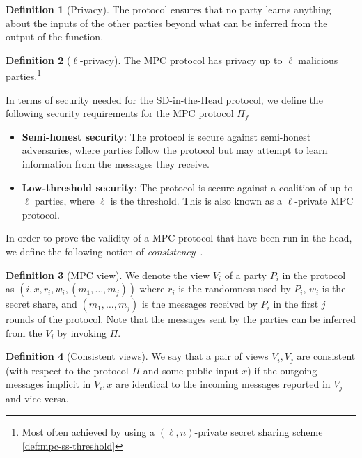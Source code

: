 \documentclass[twoside,11pt]{report}
\theoremstyle{definition}
\newtheorem{definition}{Definition}[section]
\theoremstyle{plain}
\begin{document}
\begin{definition}[Privacy]\label{def:mpc-privacy}
  The protocol ensures that no party learns anything about the inputs of the other parties beyond what can be inferred from the output of the function.
\end{definition}

\begin{definition}[$\ell$-privacy]\label{def:mpc-ell-privacy}
  The MPC protocol has privacy up to $\ell$ malicious parties.\footnote{Most often achieved by using a $(\ell, n)$-private secret sharing scheme \autoref{def:mpc-ss-threshold}}
\end{definition}

In terms of security needed for the SD-in-the-Head protocol, we define the following security requirements for the MPC protocol $\Pi_f$

\begin{itemize}
  \item \textbf{Semi-honest security}: The protocol is secure against semi-honest adversaries, where parties follow the protocol but may attempt to learn information from the messages they receive.
  \item \textbf{Low-threshold security}: The protocol is secure against a coalition of up to $\ell$ parties, where $\ell$ is the threshold. This is also known as a $\ell$-private MPC protocol.
\end{itemize}

In order to prove the validity of a MPC protocol that have been run in the head, we define the following notion of \textit{consistency}~\cite{ishai2007zero}.

\begin{definition}[MPC view]\label{def:mpc-view}
  We denote the view $V_i$ of a party $P_i$ in the protocol as $(i, x, r_i, w_i, (m_1, \dots, m_j))$ where $r_i$ is the randomness used by $P_i$, $w_i$ is the secret share, and $(m_1, \dots, m_j)$ is the messages received by $P_i$ in the first $j$ rounds of the protocol. Note that the messages sent by the parties can be inferred from the $V_i$ by invoking $\Pi$.
\end{definition}

\begin{definition}[Consistent views]\label{def:mpc-consistent-view}
  We say that a pair of views $V_i, V_j$ are consistent (with respect to the protocol $\Pi$ and some public input $x$) if the outgoing messages implicit in $V_i, x$ are identical to the incoming messages reported in $V_j$ and vice versa.
\end{definition}
\end{document}
